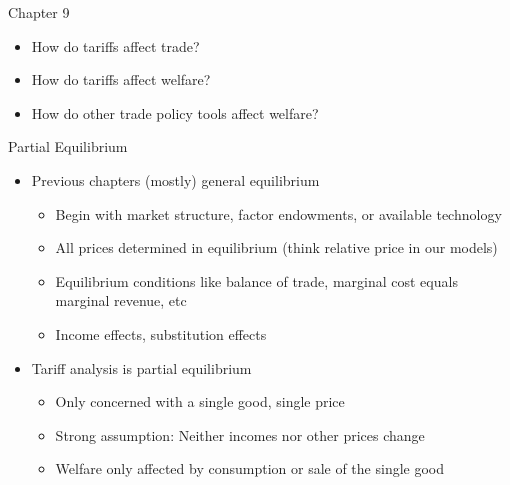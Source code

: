 \documentclass{beamer}
\begin{document}
\begin{frame}{Chapter 9}

    \begin{itemize}
        \item How do tariffs affect trade?
        \item How do tariffs affect welfare?
        \item How do other trade policy tools affect welfare?
    \end{itemize}

\end{frame}

\begin{frame}{Partial Equilibrium}

    \begin{itemize}
        \item Previous chapters (mostly) general equilibrium
        \begin{itemize}
            \item Begin with market structure, factor endowments, or available technology
            \item All prices determined in equilibrium (think relative price in our models)
            \item Equilibrium conditions like balance of trade, marginal cost equals marginal revenue, etc
            \item Income effects, substitution effects
        \end{itemize}
        \item Tariff analysis is partial equilibrium
        \begin{itemize}
            \item Only concerned with a single good, single price
            \item Strong assumption: Neither incomes nor other prices change
            \item Welfare only affected by consumption or sale of the single good
        \end{itemize}
    \end{itemize}

\end{frame}
\end{document}
